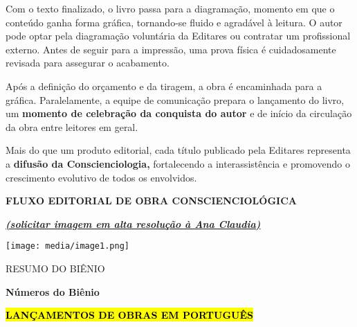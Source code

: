 Com o texto finalizado, o livro passa para a diagramação, momento em que o conteúdo ganha forma gráfica, tornando-se fluido e agradável à leitura. O autor pode optar pela diagramação voluntária da Editares ou contratar um profissional externo. Antes de seguir para a impressão, uma prova física é cuidadosamente revisada para assegurar o acabamento.

Após a definição do orçamento e da tiragem, a obra é encaminhada para a gráfica. Paralelamente, a equipe de comunicação prepara o lançamento do livro, um \textbf{momento de celebração da conquista do autor} e de início da circulação da obra entre leitores em geral.

Mais do que um produto editorial, cada título publicado pela Editares representa a \textbf{difusão da Conscienciologia,} fortalecendo a interassistência e promovendo o crescimento evolutivo de todos os envolvidos.

\textbf{FLUXO EDITORIAL DE OBRA CONSCIENCIOLÓGICA}

\emph{\textbf{\ul{(solicitar imagem em alta resolução à Ana Claudia)}}}

\texttt{[image: media/image1.png]}

RESUMO DO BIÊNIO

\textbf{Números do Biênio}

\textbf{\hl{LANÇAMENTOS DE OBRAS EM PORTUGUÊS}}

